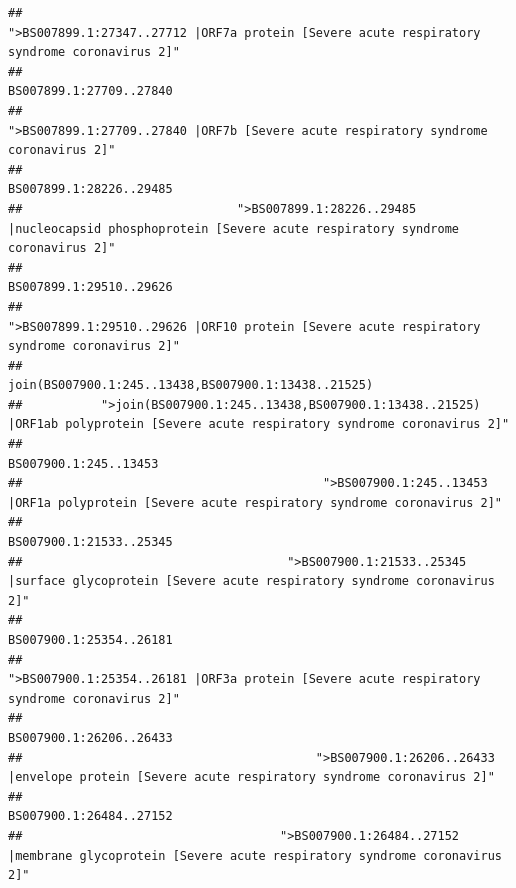 \documentclass[
]{article}
\begin{document}
\begin{verbatim}
##                                            ">BS007899.1:27347..27712 |ORF7a protein [Severe acute respiratory syndrome coronavirus 2]" 
##                                                                                                                BS007899.1:27709..27840 
##                                                    ">BS007899.1:27709..27840 |ORF7b [Severe acute respiratory syndrome coronavirus 2]" 
##                                                                                                                BS007899.1:28226..29485 
##                              ">BS007899.1:28226..29485 |nucleocapsid phosphoprotein [Severe acute respiratory syndrome coronavirus 2]" 
##                                                                                                                BS007899.1:29510..29626 
##                                            ">BS007899.1:29510..29626 |ORF10 protein [Severe acute respiratory syndrome coronavirus 2]" 
##                                                                                    join(BS007900.1:245..13438,BS007900.1:13438..21525) 
##           ">join(BS007900.1:245..13438,BS007900.1:13438..21525) |ORF1ab polyprotein [Severe acute respiratory syndrome coronavirus 2]" 
##                                                                                                                  BS007900.1:245..13453 
##                                          ">BS007900.1:245..13453 |ORF1a polyprotein [Severe acute respiratory syndrome coronavirus 2]" 
##                                                                                                                BS007900.1:21533..25345 
##                                     ">BS007900.1:21533..25345 |surface glycoprotein [Severe acute respiratory syndrome coronavirus 2]" 
##                                                                                                                BS007900.1:25354..26181 
##                                            ">BS007900.1:25354..26181 |ORF3a protein [Severe acute respiratory syndrome coronavirus 2]" 
##                                                                                                                BS007900.1:26206..26433 
##                                         ">BS007900.1:26206..26433 |envelope protein [Severe acute respiratory syndrome coronavirus 2]" 
##                                                                                                                BS007900.1:26484..27152 
##                                    ">BS007900.1:26484..27152 |membrane glycoprotein [Severe acute respiratory syndrome coronavirus 2]" 

\end{verbatim}
\end{document}
